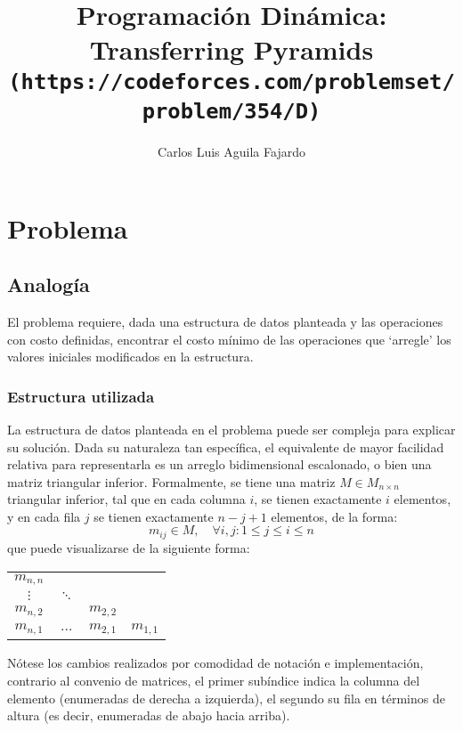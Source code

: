 \documentclass{article}
\title{
	   Programación Dinámica: Transferring Pyramids\\
	   \texttt{{\large (https://codeforces.com/problemset/problem/354/D)}}}
\author{Carlos Luis Aguila Fajardo}
\date{}
\theoremstyle{default}
\begin{document}
\maketitle
%
%
%
\section{Problema}
	\subsection{Analogía}
		El problema requiere, dada una estructura de datos planteada y las operaciones con costo definidas, encontrar el costo mínimo de las operaciones que `arregle' los valores iniciales modificados en la estructura.
		\subsubsection{Estructura utilizada}
			La estructura de datos planteada en el problema puede ser compleja para explicar su solución. Dada su naturaleza tan específica, el equivalente de mayor facilidad relativa para representarla es un arreglo bidimensional escalonado, o bien una matriz triangular inferior. Formalmente, se tiene una matriz $M \in M_{n \times n}$ triangular inferior, tal que en cada columna $i$, se tienen exactamente $i$ elementos, y en cada fila $j$ se tienen exactamente $n-j+1$ elementos, de la forma:
			\begin{equation*}
				m_{ij} \in M, \quad \forall i,j: 1 \leq j \leq i \leq n
			\end{equation*}
			que puede visualizarse de la siguiente forma:
			\begin{center}
				\begin{tabular}{|*4{c|}}
					\cline{1-1}
					$m_{n,n}$ \\
					\cline{1-2}
					$$\vdots$$	& $\ddots$	\\
					\cline{1-3}
					$m_{n,2}$  	&			& $m_{2,2}$  	\\
					\hline
					$m_{n,1}$	& $\dots$	& $m_{2,1}$ 	& $m_{1,1}$	\\
					\hline
				\end{tabular}
			\end{center}
			Nótese los cambios realizados por comodidad de notación e implementación, contrario al convenio de matrices, el primer subíndice indica la columna del elemento (enumeradas de derecha a izquierda), el segundo su fila en términos de altura (es decir, enumeradas de abajo hacia arriba).
\end{document}
